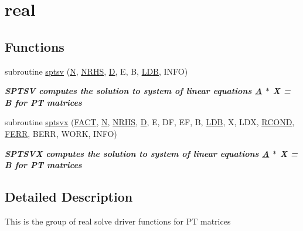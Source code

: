 \hypertarget{group__realPTsolve}{}\section{real}
\label{group__realPTsolve}
\subsection*{Functions}
\begin{DoxyCompactItemize}
\item 
subroutine \hyperlink{group__realPTsolve_ga4b54ec5cf63547490c2a0258036b7f72}{sptsv} (\hyperlink{polmisc_8c_a0240ac851181b84ac374872dc5434ee4}{N}, \hyperlink{example__user_8c_aa0138da002ce2a90360df2f521eb3198}{N\+R\+H\+S}, \hyperlink{odrpack_8h_a7dae6ea403d00f3687f24a874e67d139}{D}, E, B, \hyperlink{example__user_8c_a50e90a7104df172b5a89a06c47fcca04}{L\+D\+B}, I\+N\+F\+O)
\begin{DoxyCompactList}\small\item\em {\bfseries  S\+P\+T\+S\+V computes the solution to system of linear equations \hyperlink{classA}{A} $\ast$ X = B for P\+T matrices} \end{DoxyCompactList}\item 
subroutine \hyperlink{group__realPTsolve_gab3fbf901ac3c3e7b56d7fd79b6c5b54d}{sptsvx} (\hyperlink{superlu__enum__consts_8h_af00a42ecad444bbda75cde1b64bd7e72a1b6692b56d378abb85bd49063721d034}{F\+A\+C\+T}, \hyperlink{polmisc_8c_a0240ac851181b84ac374872dc5434ee4}{N}, \hyperlink{example__user_8c_aa0138da002ce2a90360df2f521eb3198}{N\+R\+H\+S}, \hyperlink{odrpack_8h_a7dae6ea403d00f3687f24a874e67d139}{D}, E, D\+F, E\+F, B, \hyperlink{example__user_8c_a50e90a7104df172b5a89a06c47fcca04}{L\+D\+B}, X, L\+D\+X, \hyperlink{superlu__enum__consts_8h_af00a42ecad444bbda75cde1b64bd7e72a9b5c151728d8512307565994c89919d5}{R\+C\+O\+N\+D}, \hyperlink{superlu__enum__consts_8h_af00a42ecad444bbda75cde1b64bd7e72a78fd14d7abebae04095cfbe02928f153}{F\+E\+R\+R}, B\+E\+R\+R, W\+O\+R\+K, I\+N\+F\+O)
\begin{DoxyCompactList}\small\item\em {\bfseries  S\+P\+T\+S\+V\+X computes the solution to system of linear equations \hyperlink{classA}{A} $\ast$ X = B for P\+T matrices} \end{DoxyCompactList}\end{DoxyCompactItemize}


\subsection{Detailed Description}
This is the group of real solve driver functions for P\+T matrices 

